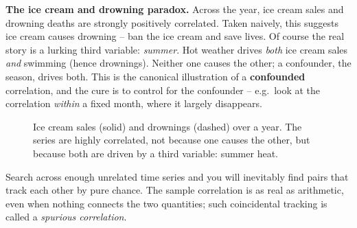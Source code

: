 \begin{paradoxbox}
\textbf{The ice cream and drowning paradox.} Across the year, ice cream sales and
drowning deaths are strongly positively correlated. Taken naively, this suggests ice
cream causes drowning -- ban the ice cream and save lives. Of course the real story
is a lurking third variable: \emph{summer}. Hot weather drives \emph{both} ice cream
sales \emph{and} swimming (hence drownings). Neither one causes the other; a
confounder, the season, drives both. This is the canonical illustration of a
\textbf{confounded} correlation, and the cure is to control for the confounder --
e.g.\ look at the correlation \emph{within} a fixed month, where it largely
disappears.

\begin{figure}[H]
\centering
{}
\caption{Ice cream sales (solid) and drownings (dashed) over a year. The series are highly correlated, not because one causes the other, but because both are driven by a third variable: summer heat.}
\label{ch14:fig-ice-cream}
\end{figure}

Search across enough unrelated time series and you will inevitably find pairs
that track each other by pure chance. The sample correlation is as real as arithmetic, even when nothing connects the two quantities; such coincidental tracking is called a \emph{spurious correlation}.
\end{paradoxbox}

